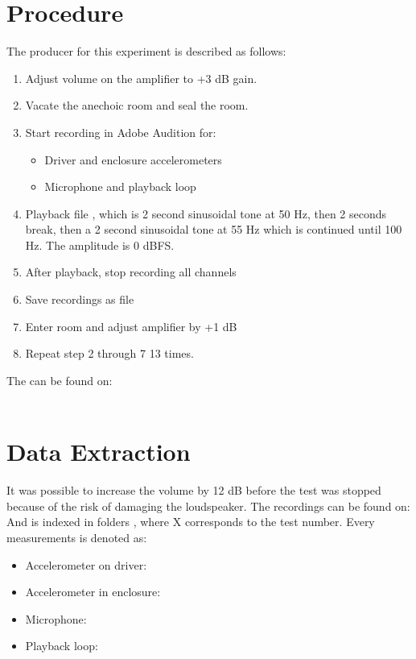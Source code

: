 \section{Procedure}\label{sec:SpeakerTestProcedure2}

The producer for this experiment is described as follows:
\begin{enumerate}
\item Adjust volume on the amplifier to +3 dB gain.
\item Vacate the anechoic room and seal the room.
\item Start recording in Adobe Audition for:
\begin{itemize}
\item Driver and enclosure accelerometers
\item Microphone and playback loop
\end{itemize}
\item Playback file , which is 2 second sinusoidal tone at 50 Hz, then 2 seconds break, then a 2 second sinusoidal tone at 55 Hz which is continued until 100 Hz. The amplitude is 0 dBFS.
\item After playback, stop recording all channels
\item Save recordings as  file
\item Enter room and adjust amplifier by +1 dB
\item Repeat step 2 through 7 13 times.
\end{enumerate}

The  can be found on:\\
\\

\section{Data Extraction}
It was possible to increase the volume by 12 dB before the test was stopped because of the risk of damaging the loudspeaker.
The recordings can be found on:\\
And is indexed in folders , where X corresponds to the test number. Every measurements is denoted as:
\begin{itemize}
\item Accelerometer on driver: 
\item Accelerometer in enclosure: 
\item Microphone: 
\item Playback loop: 
\end{itemize}


